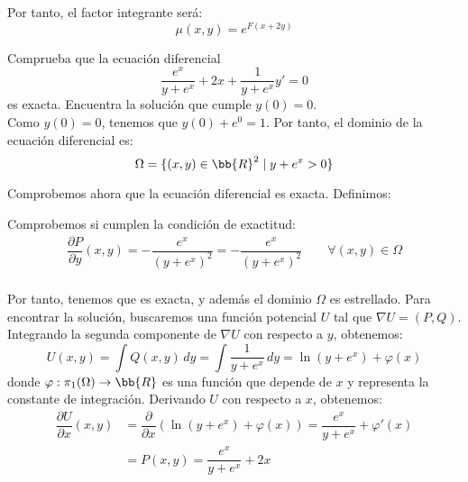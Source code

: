 \documentclass[12pt]{article}
\begin{document}
\begin{ejercicio}
        Por tanto, el factor integrante será:
        \begin{equation*}
            \mu(x, y) = e^{F(x + 2y)}
        \end{equation*}
    \end{ejercicio}

    \begin{ejercicio}
        Comprueba que la ecuación diferencial
        \begin{equation*}
            \dfrac{e^x}{y+e^x} +2x+\dfrac{1}{y + e^x}y' = 0
        \end{equation*}
        es exacta. Encuentra la solución que cumple $y(0) = 0$.\\

        Como $y(0)=0$, tenemos que $y(0)+e^0=1$. Por tanto, el dominio de la ecuación diferencial es:
        \begin{equation*}
            \Omega=\{(x,y)\in\bb{R}^2\mid y+e^x > 0\}
        \end{equation*}
        
        Comprobemos ahora que la ecuación diferencial es exacta.
        Definimos:

        Comprobemos si cumplen la condición de exactitud:
        \begin{align*}
            \dfrac{\partial P}{\partial y}(x,y) = -\dfrac{e^x}{(y+e^x)^2} = -\dfrac{e^x}{(y+e^x)^2}\qquad \forall (x,y)\in\Omega\\
        \end{align*}

        Por tanto, tenemos que es exacta, y además el dominio $\Omega$ es estrellado. Para encontrar la solución, buscaremos una función potencial $U$ tal que $\nabla U = (P,Q)$.
        Integrando la segunda componente de $\nabla U$ con respecto a $y$, obtenemos:
        \begin{equation*}
            U(x,y) = \int Q(x,y)\,dy = \int \dfrac{1}{y+e^x}\,dy = \ln(y+e^x) + \varphi(x)
        \end{equation*}
        donde $\varphi:\pi_1(\Omega)\to\bb{R}$ es una función que depende de $x$ y representa la constante de integración. Derivando $U$ con respecto a $x$, obtenemos:
        \begin{align*}
            \dfrac{\partial U}{\partial x}(x,y) &= \dfrac{\partial}{\partial x}(\ln(y+e^x) + \varphi(x)) = \dfrac{e^x}{y+e^x} + \varphi'(x)\\
            &= P(x,y) = \dfrac{e^x}{y+e^x} + 2x
        \end{align*}


\end{ejercicio}
\end{document}
